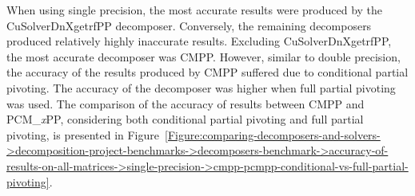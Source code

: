 When using single precision, the most accurate results were produced by the CuSolverDnXgetrfPP decomposer. Conversely, the remaining decomposers produced relatively highly inaccurate results. Excluding CuSolverDnXgetrfPP, the most accurate decomposer was CMPP. However, similar to double precision, the accuracy of the results produced by CMPP suffered due to conditional partial pivoting. The accuracy of the decomposer was higher when full partial pivoting was used. The comparison of the accuracy of results between CMPP and PCM\_\textit{x}PP, considering both conditional partial pivoting and full partial pivoting, is presented in Figure~\ref{Figure:comparing-decomposers-and-solvers->decomposition-project-benchmarks->decomposers-benchmark->accuracy-of-results-on-all-matrices->single-precision->cmpp-pcmpp-conditional-vs-full-partial-pivoting}.

